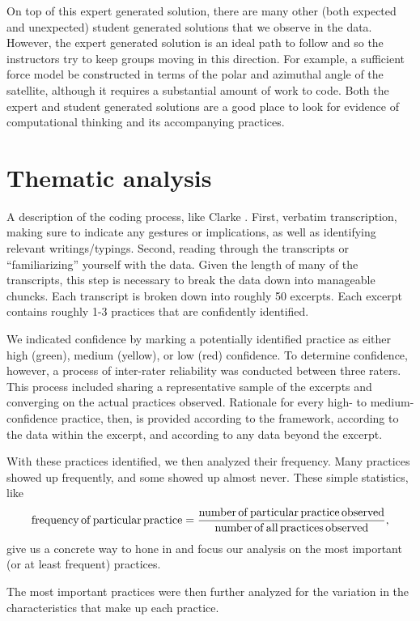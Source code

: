 \documentclass{msuphddissertation}
\begin{document}
\begin{doublespace}
On top of this expert generated solution, there are many other (both expected and unexpected) student generated solutions that we observe in the data.  However, the expert generated solution is an ideal path to follow and so the instructors try to keep groups moving in this direction.  For example, a sufficient force model be constructed in terms of the polar and azimuthal angle of the satellite, although it requires a substantial amount of work to code.  Both the expert and student generated solutions are a good place to look for evidence of computational thinking and its accompanying practices.

\section{Thematic analysis}

A description of the coding process, like Clarke \cite{Braun2008}.  First, verbatim transcription, making sure to indicate any gestures or implications, as well as identifying relevant writings/typings.  Second, reading through the transcripts or ``familiarizing'' yourself with the data.  Given the length of many of the transcripts, this step is necessary to break the data down into manageable chuncks.  Each transcript is broken down into roughly 50 excerpts.  Each excerpt contains roughly 1-3 practices that are confidently identified.

We indicated confidence by marking a potentially identified practice as either high (green), medium (yellow), or low (red) confidence.  To determine confidence, however, a process of inter-rater reliability was conducted between three raters.  This process included sharing a representative sample of the excerpts and converging on the actual practices observed.  Rationale for every high- to medium-confidence practice, then, is provided according to the framework, according to the data within the excerpt, and according to any data beyond the excerpt.

With these practices identified, we then analyzed their frequency.  Many practices showed up frequently, and some showed up almost never.  These simple statistics, like $${\rm frequency\,of\,particular\,practice}=\frac{\rm number\,of\,particular\,practice\,observed}{\rm number\,of\,all\,practices\,observed},$$ give us a concrete way to hone in and focus our analysis on the most important (or at least frequent) practices.

The most important practices were then further analyzed for the variation in the characteristics that make up each practice.


\end{doublespace}
\end{document}
